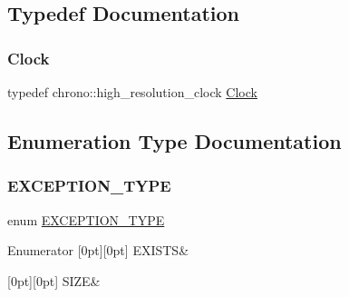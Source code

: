 \subsection{Typedef Documentation}
\mbox{\label{utils_8hh_af5fd44b7ee78ceeb4a0e869179f422f7}} 
\subsubsection{\texorpdfstring{Clock}{Clock}}
{\footnotesize\ttfamily typedef chrono\+::high\+\_\+resolution\+\_\+clock \mbox{\hyperlink{utils_8hh_af5fd44b7ee78ceeb4a0e869179f422f7}{Clock}}}



\subsection{Enumeration Type Documentation}
\mbox{\label{utils_8hh_af26a5d951fd6ab4b44e6cd8425aa0383}} 
\subsubsection{\texorpdfstring{EXCEPTION\_TYPE}{EXCEPTION\_TYPE}}
{\footnotesize\ttfamily enum \mbox{\hyperlink{utils_8hh_af26a5d951fd6ab4b44e6cd8425aa0383}{E\+X\+C\+E\+P\+T\+I\+O\+N\+\_\+\+T\+Y\+PE}}}

\begin{DoxyEnumFields}{Enumerator}
[0pt][0pt]{}\mbox{\label{utils_8hh_af26a5d951fd6ab4b44e6cd8425aa0383a3197625a1bb2264943f5a95f236d9973}} 
E\+X\+I\+S\+TS&\\
\hline

[0pt][0pt]{}\mbox{\label{utils_8hh_af26a5d951fd6ab4b44e6cd8425aa0383a4aa71180778b711338785695df5d7c52}} 
S\+I\+ZE&\\
\hline

\end{DoxyEnumFields}



